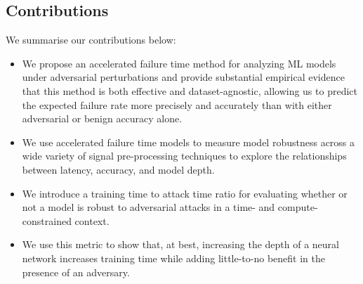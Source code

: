 \subsection{Contributions}

We summarise our contributions below:
\begin{itemize}
	\item We propose an accelerated failure time method for analyzing ML models under adversarial perturbations and provide substantial empirical evidence that this method is both effective and dataset-agnostic, allowing us to predict the expected failure rate more precisely and accurately than with either adversarial or benign accuracy alone.
	\item We use accelerated failure time models to measure model robustness across a wide variety of signal pre-processing techniques to explore the relationships between latency, accuracy, and model depth.
	\item We introduce a training time to attack time ratio for evaluating whether or not a model is robust to adversarial attacks in a time- and compute-constrained context.
	\item We use this metric to show that, at best, increasing the depth of a neural network increases training time while adding little-to-no benefit in the presence of an adversary.
\end{itemize}
